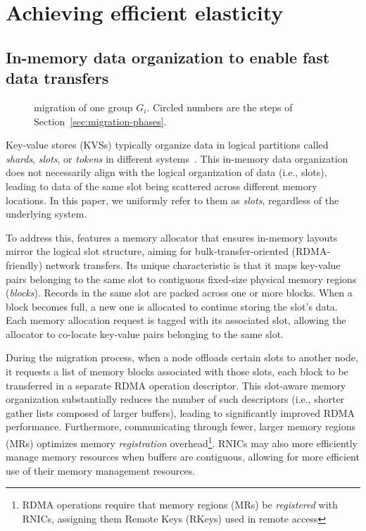 
\section{Achieving efficient elasticity}
\label{sec:design}

\subsection{In-memory data organization to enable fast data transfers}
\label{sec:data_organization}

\begin{figure}[t]
	\centering
	
	\caption{\OurImplementation{} migration of one group $G_i$. Circled numbers are the steps of Section~\ref{sec:migration-phases}.}
	\label{fig:migration_flow}
\end{figure}



Key-value stores (KVSs) typically organize data in logical partitions called {\em shards}, {\em slots}, or {\em tokens} in different systems~\cite{mongodb,redis-pure,cassandra-paper}.
This in-memory data organization does not necessarily align with the logical organization of data (i.e., slots), leading to data of the same slot being scattered across different memory locations.
In this paper, we uniformly refer to them as \emph{slots}, regardless of the underlying system.

To address this, \OurImplementation{} features a memory allocator that ensures in-memory layouts mirror the logical slot structure, aiming for bulk-transfer-oriented (RDMA-friendly) network transfers.
Its unique characteristic is that it maps key-value pairs belonging to the same slot to contiguous fixed-size physical memory regions ({\em blocks}).
Records in the same slot are packed across one or more blocks. When a block becomes full, a new one is allocated to continue storing the slot’s data.
Each memory allocation request is tagged with its associated slot, allowing the allocator to co-locate key-value pairs belonging to the same slot.

During the migration process, when a node offloads certain slots to another node, it requests a list of memory blocks associated with those slots, each block to be transferred in a separate RDMA operation descriptor.
This slot-aware memory organization substantially reduces the number of such descriptors (i.e., shorter gather lists composed of larger buffers), leading to significantly improved RDMA performance.
Furthermore, communicating through fewer, larger memory regions (MRs) optimizes memory \emph{registration} overhead\footnote{RDMA operations require that memory regions (MRs) be {\em registered} with RNICs, assigning them Remote Keys (RKeys) used in remote access}.
RNICs may also more efficiently manage memory resources when buffers are contiguous, allowing for more efficient use of their memory management resources.


